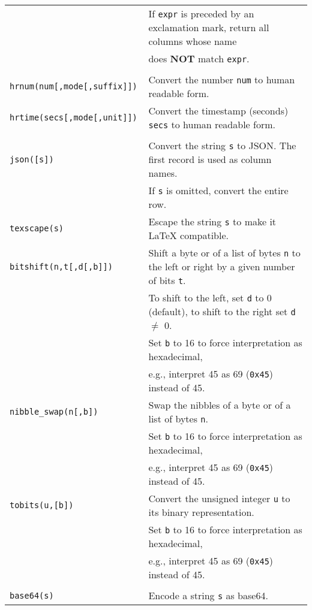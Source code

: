 \documentclass[documentation]{subfiles}
\begin{document}
\begin{longtable}{>{\tt}ll}
                                & If {\tt expr} is preceded by an exclamation mark, return all columns whose name\\
                                & does {\bf NOT} match {\tt expr}.\\
    \\
    hrnum(num[,mode[,suffix]])  & Convert the number {\tt num} to human readable form.\\
    hrtime(secs[,mode[,unit]])  & Convert the timestamp (seconds) {\tt secs} to human readable form.\\
    \\
    json([s])                   & Convert the string {\tt s} to JSON. The first record is used as column names.\\
                                & If {\tt s} is omitted, convert the entire row.\\
    texscape(s)                 & Escape the string {\tt s} to make it LaTeX compatible.\\
    bitshift(n,t[,d[,b]])       & Shift a byte or of a list of bytes {\tt n} to the left or right by a given number of bits {\tt t}.\\
                                & To shift to the left, set {\tt d} to 0 (default), to shift to the right set {\tt d} $\neq$ 0.\\
                                & Set {\tt b} to 16 to force interpretation as hexadecimal,\\
                                & e.g., interpret 45 as 69 ({\tt 0x45}) instead of 45.\\
    nibble\_swap(n[,b])         & Swap the nibbles of a byte or of a list of bytes {\tt n}.\\
                                & Set {\tt b} to 16 to force interpretation as hexadecimal,\\
                                & e.g., interpret 45 as 69 ({\tt 0x45}) instead of 45.\\
    tobits(u,[b])               & Convert the unsigned integer {\tt u} to its binary representation.\\
                                & Set {\tt b} to 16 to force interpretation as hexadecimal,\\
                                & e.g., interpret 45 as 69 ({\tt 0x45}) instead of 45.\\
    \\
    base64(s)                   & Encode a string {\tt s} as base64.\\

\end{longtable}
\end{document}
